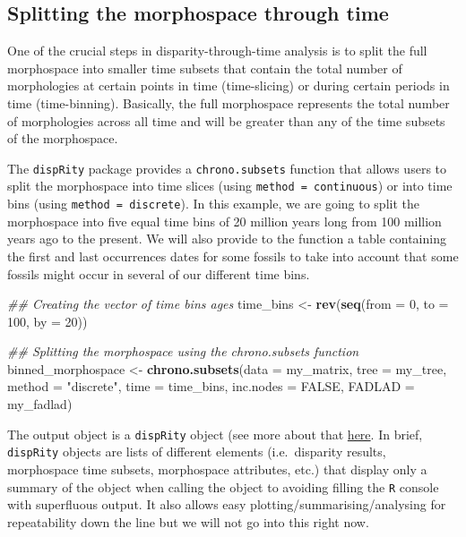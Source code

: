 \documentclass[
]{book}
\newenvironment{Shaded}{\begin{snugshade}}{\end{snugshade}}
\newcommand{\CommentTok}[1]{\textcolor[rgb]{0.56,0.35,0.01}{\textit{#1}}}
\newcommand{\DataTypeTok}[1]{\textcolor[rgb]{0.13,0.29,0.53}{#1}}
\newcommand{\DecValTok}[1]{\textcolor[rgb]{0.00,0.00,0.81}{#1}}
\newcommand{\KeywordTok}[1]{\textcolor[rgb]{0.13,0.29,0.53}{\textbf{#1}}}
\newcommand{\NormalTok}[1]{#1}
\newcommand{\OtherTok}[1]{\textcolor[rgb]{0.56,0.35,0.01}{#1}}
\newcommand{\StringTok}[1]{\textcolor[rgb]{0.31,0.60,0.02}{#1}}
\begin{document}
\hypertarget{splitting-the-morphospace-through-time}{%
\subsection{Splitting the morphospace through time}\label{splitting-the-morphospace-through-time}}

One of the crucial steps in disparity-through-time analysis is to split the full morphospace into smaller time subsets that contain the total number of morphologies at certain points in time (time-slicing) or during certain periods in time (time-binning).
Basically, the full morphospace represents the total number of morphologies across all time and will be greater than any of the time subsets of the morphospace.

The \texttt{dispRity} package provides a \texttt{chrono.subsets} function that allows users to split the morphospace into time slices (using \texttt{method\ =\ continuous}) or into time bins (using \texttt{method\ =\ discrete}).
In this example, we are going to split the morphospace into five equal time bins of 20 million years long from 100 million years ago to the present.
We will also provide to the function a table containing the first and last occurrences dates for some fossils to take into account that some fossils might occur in several of our different time bins.

\begin{Shaded}
\begin{Highlighting}[]
\CommentTok{\#\# Creating the vector of time bins ages}
\NormalTok{time\_bins \textless{}{-}}\StringTok{ }\KeywordTok{rev}\NormalTok{(}\KeywordTok{seq}\NormalTok{(}\DataTypeTok{from =} \DecValTok{0}\NormalTok{, }\DataTypeTok{to =} \DecValTok{100}\NormalTok{, }\DataTypeTok{by =} \DecValTok{20}\NormalTok{))}

\CommentTok{\#\# Splitting the morphospace using the chrono.subsets function}
\NormalTok{binned\_morphospace \textless{}{-}}\StringTok{ }\KeywordTok{chrono.subsets}\NormalTok{(}\DataTypeTok{data =}\NormalTok{ my\_matrix, }\DataTypeTok{tree =}\NormalTok{ my\_tree,}
    \DataTypeTok{method =} \StringTok{"discrete"}\NormalTok{, }\DataTypeTok{time =}\NormalTok{ time\_bins, }\DataTypeTok{inc.nodes =} \OtherTok{FALSE}\NormalTok{,}
    \DataTypeTok{FADLAD =}\NormalTok{ my\_fadlad)}
\end{Highlighting}
\end{Shaded}

The output object is a \texttt{dispRity} object (see more about that \protect\hyperlink{The-guts-of-the-dispRity-package}{here}.
In brief, \texttt{dispRity} objects are lists of different elements (i.e.~disparity results, morphospace time subsets, morphospace attributes, etc.) that display only a summary of the object when calling the object to avoiding filling the \texttt{R} console with superfluous output.
It also allows easy plotting/summarising/analysing for repeatability down the line but we will not go into this right now.
\end{document}
